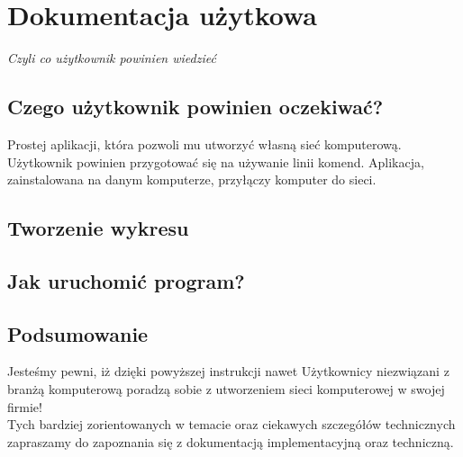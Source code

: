 \section{Dokumentacja użytkowa}

\begin{center}
\textit{Czyli co użytkownik powinien wiedzieć}
\end{center}



\subsection{Czego użytkownik powinien oczekiwać?}
Prostej aplikacji, która pozwoli mu utworzyć własną sieć komputerową. Użytkownik powinien przygotować się na używanie linii komend.
Aplikacja, zainstalowana na danym komputerze, przyłączy komputer do sieci.

\subsection{Tworzenie wykresu}

\subsection{Jak uruchomić program?}

\subsection{Podsumowanie}
Jesteśmy pewni, iż dzięki powyższej instrukcji nawet Użytkownicy niezwiązani z branżą komputerową poradzą sobie z utworzeniem sieci komputerowej w swojej firmie!\\
Tych bardziej zorientowanych w temacie oraz ciekawych szczegółów technicznych zapraszamy do zapoznania się z dokumentacją implementacyjną oraz techniczną.